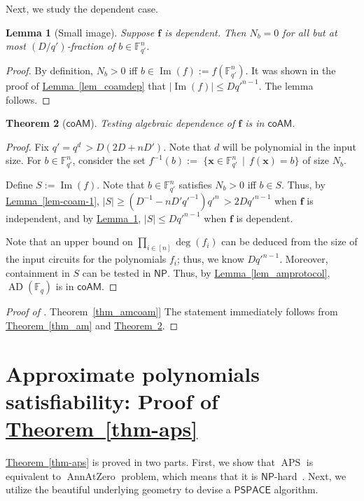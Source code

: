 \documentclass[11pt]{article}
\numberwithin{equation}{section}
\newtheorem{theorem}{Theorem}[section]
\newtheorem{lemma}[theorem]{Lemma}
\theoremstyle{definition}
\theoremstyle{plain}
\newcommand{\cclass}[1]{\textsf{#1}}
\newcommand{\expref}[2]{\hyperref[#2]{#1~\ref{#2}}}
\newcommand{\F}{\mathbb{F}}
\DeclareMathOperator{\im}{\mathrm{Im}}
\newcommand{\NP}{\cclass{NP}\xspace}  %
\newcommand{\coAM}{\cclass{coAM}\xspace}  %
\newcommand{\PSPACE}{\cclass{PSPACE}\xspace}  %
\DeclareMathOperator{\AD}{\mathrm{AD}\xspace} %
\DeclareMathOperator{\APS}{\mathrm{APS}\xspace} %
\DeclareMathOperator{\AnnAtZero}{\mathrm{AnnAtZero}\xspace} %
\begin{document}
Next, we study the dependent case.

\begin{lemma}[Small image]\label{lem-coam-2}
Suppose $\mathbf f$
%
is  %
dependent.
Then $N_b=0$ for all but at most $(D/q')$-fraction of $b\in \F_{q'}^n$.
\end{lemma}
\begin{proof}
%
By definition, %
$N_b>0$ iff $b\in \im(f):=f(\F_{q'}^n)$. It was shown in the proof of \expref{Lemma}{lem_coamdep} that $|\im(f)| \le Dq'^{n-1}$. The lemma follows.
\end{proof}

\begin{theorem}[$\coAM$]\label{thm_coam}
Testing algebraic dependence of $\mathbf f$ is in $\coAM$.
\end{theorem}
\begin{proof}
Fix $q'=q^d \,> D(2D+nD')$. Note that $d$ will be polynomial in the input size.
For $b\in \F_{q'}^n$, consider the set 
$f^{-1}(b) :=$ $\{\mathbf x \in \F_{q'}^n \,\mid\, f(\mathbf x) = b \}$ of size $N_b$.

Define $S:= \im(f)$. Note that %
$b\in \F_{q'}^n$
%
satisfies   %
$N_b>0$ iff $b\in S$.
%
%
%
Thus, by \expref{Lemma}{lem-coam-1},
$|S|\ge (D^{-1} - nD'q'^{-1})q'^n\,> 2Dq'^{n-1}$ 
when $\mathbf f$ is independent, and
by \expref{Lemma}{lem-coam-2}, $|S|\le Dq'^{n-1}$
when $\mathbf f$ is dependent.

Note that an upper bound on $\prod_{i\in [n]}\deg(f_i)$ can be deduced from the size of the input circuits for 
%
the polynomials $f_i$; %
thus, we know $Dq'^{n-1}$. Moreover, containment in $S$ can be tested in $\NP$. Thus, by \expref{Lemma}{lem_amprotocol},
%
$\AD(\F_q)$    %
is in $\coAM$.
\end{proof}

\begin{proof}[Proof of \expref{Theorem}{thm_amcoam}]
The statement immediately follows from \expref{Theorem}{thm_am} and \expref{Theorem}{thm_coam}.
\end{proof}


%

\section{Approximate polynomials satisfiability: Proof of \expref{Theorem}{thm-aps}} \label{sec:aps}
%

\expref{Theorem}{thm-aps} is proved in two parts. First, we show that $\APS$ is equivalent to $\AnnAtZero$ 
%
problem, %
which means that it is $\NP$-hard~\cite{Kay09}. Next, we utilize the  beautiful underlying geometry to devise a $\PSPACE$ algorithm.
\end{document}
